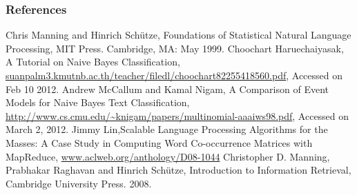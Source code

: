 \documentclass[serif,11pt,aspectratio=1610,table]{beamer}
\begin{document}
\begin{frame}
 \frametitle{References}
\footnotesize
\begin{thebibliography}{9}
  Chris Manning and Hinrich Schütze, Foundations of Statistical Natural Language Processing, MIT Press. Cambridge, MA: May 1999.
  Choochart Haruechaiyasak, A Tutorial on Naive Bayes Classification, \url{suanpalm3.kmutnb.ac.th/teacher/filedl/choochart82255418560.pdf}, Accessed on Feb 10 2012. 
  Andrew McCallum and Kamal Nigam, A Comparison of Event Models for Naive Bayes Text Classification, \url{http://www.cs.cmu.edu/~knigam/papers/multinomial-aaaiws98.pdf}, Accessed on March 2, 2012. 
  Jimmy Lin,Scalable Language Processing Algorithms for the Masses: A Case Study in Computing Word Co-occurrence Matrices with MapReduce, \url{www.aclweb.org/anthology/D08-1044}
  Christopher D. Manning, Prabhakar Raghavan and Hinrich Schütze, Introduction to Information Retrieval, Cambridge University Press. 2008.
\end{thebibliography}

\end{frame}

\end{document}
